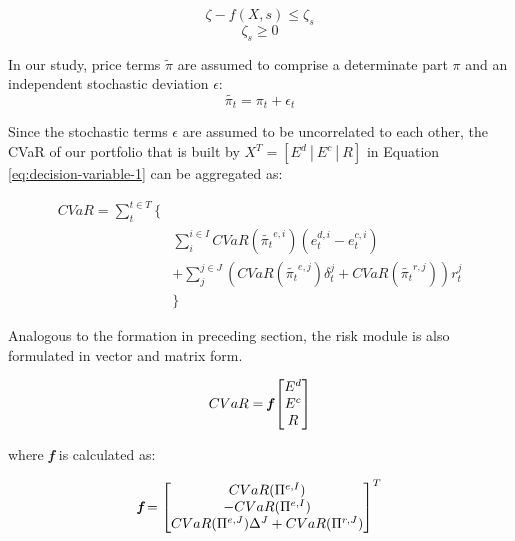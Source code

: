 \begin{equation*}
\zeta - f(X,s) \leq \zeta_s
\end{equation*}
\begin{equation*}
\zeta_s \geq 0
\end{equation*}

In our study, price terms $\tilde{\pi}$ are assumed to comprise a determinate part $\pi$ and an independent stochastic deviation $\epsilon$:
\begin{equation}
\label{eq:price-error}
\tilde{\pi_t}= \pi_t + \epsilon_t
\end{equation}

Since the stochastic terms $\epsilon$ are assumed to be uncorrelated to each other, the CVaR of our portfolio that is built by  $X^T = [E^d~|~E^c~|~R]$
in Equation \eqref{eq:decision-variable-1} can be aggregated as:

\begin{equation}
\begin{aligned}
CVaR =\sum_{t}^{t \in T} \{&\\
&\sum_{i}^{i \in I}  CVaR(\tilde{\pi_t}^{e,i}) (e_t^{d,i} - e_t^{c,i})  \\
&+ \sum_{j}^{j \in J} \left(CVaR(\tilde{\pi_t}^{e,j}) \delta_t^{j} + CVaR(\tilde{\pi_t}^{r,j})\right) r_t^j \\
&\}
\end{aligned}
\end{equation}

Analogous to the formation in preceding section, the risk module is also formulated in vector and matrix form.

\begin{equation*}
CVaR= \textit{\textbf{f}}
\begin{bmatrix}
E^d \\ E^c \\ R
\end{bmatrix}
\end{equation*}

where \textit{\textbf{f}} is calculated as:

\begin{equation}
\textit{\textbf{f}} =
\begin{bmatrix}
CVaR(\Pi^{e,I})\\-CVaR(\Pi^{e,I})\\CVaR(\Pi^{e,J}) \Delta^J + CVaR(\Pi^{r,J})
\end{bmatrix}^T
\end{equation}